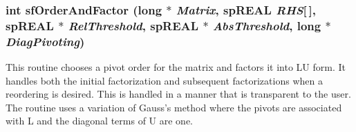 \subsubsection{\setlength{\rightskip}{0pt plus 5cm}int sf\-Order\-And\-Factor (long $\ast$ {\em Matrix}, sp\-REAL {\em RHS}[$\,$], sp\-REAL $\ast$ {\em Rel\-Threshold}, sp\-REAL $\ast$ {\em Abs\-Threshold}, long $\ast$ {\em Diag\-Pivoting})}\label{spFortran_8c_a61}


This routine chooses a pivot order for the matrix and factors it into LU form. It handles both the initial factorization and subsequent factorizations when a reordering is desired. This is handled in a manner that is transparent to the user. The routine uses a variation of Gauss's method where the pivots are associated with L and the diagonal terms of U are one.

